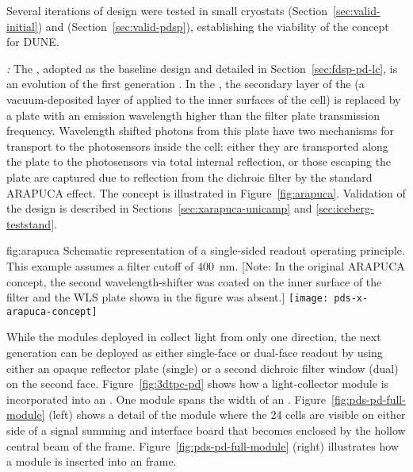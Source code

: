 Several iterations of  design were tested in small cryostats (Section~\ref{sec:valid-initial}) and  (Section~\ref{sec:valid-pdsp}), establishing the viability of the concept for DUNE.

\textit{:} The , adopted as the baseline design and detailed in 
Section~\ref{sec:fdsp-pd-lc}, is an evolution of the first generation .  In the , the secondary  layer of the  (a vacuum-deposited layer of  applied to the inner surfaces of the cell) is replaced by a  plate with an emission wavelength higher than the filter plate transmission frequency.  Wavelength shifted photons from this plate have two mechanisms for transport to the photosensors inside the cell: either they are transported along the  plate to the photosensors via total internal reflection, or those escaping the plate are captured due to reflection from the dichroic filter by the standard ARAPUCA effect.
The concept is illustrated in Figure~\ref{fig:arapuca}.
Validation of the  design is described in Sections~\ref{sec:xarapuca-unicamp} and \ref{sec:iceberg-teststand}.

\begin{dunefigure}{fig:arapuca}
{Schematic representation of a single-sided readout   operating principle.  This example assumes a filter cutoff of \SI{400}{nm}. [Note: In the original ARAPUCA concept, the second wavelength-shifter was coated on the inner surface of the filter and the WLS plate shown in the figure was absent.]}               
\texttt{[image: pds-x-arapuca-concept]}   
\end{dunefigure}

While the  modules deployed in  collect light from only one direction, the next generation  can be deployed as either single-face or dual-face readout by using either an opaque reflector plate (single) or a second dichroic filter window (dual) on the second face. 
Figure~\ref{fig:3dtpc-pd} shows how a light-collector module is incorporated into an . One module spans the width of an . Figure~\ref{fig:pds-pd-full-module} (left) shows a detail of the module where the 24  cells are visible on either side of a signal summing and interface board that becomes enclosed by the hollow central beam of the  frame. Figure~\ref{fig:pds-pd-full-module} (right) illustrates how a module is inserted into an  frame.


